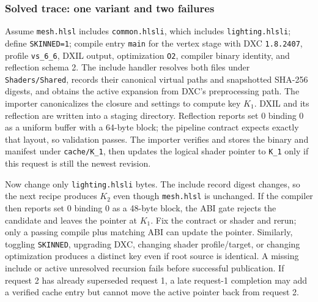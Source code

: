 \subsubsection{Solved trace: one variant and two failures}\label{05-engine-i-ch010-solved-trace-one-variant-and-two-failures}

Assume \texttt{mesh.hlsl} includes \texttt{common.hlsli}, which includes \texttt{lighting.hlsli}; define \texttt{SKINNED=1}; compile entry \texttt{main} for the vertex stage with DXC \texttt{1.8.2407}, profile \texttt{vs\_6\_6}, DXIL output, optimization \texttt{O2}, compiler binary identity, and reflection schema 2. The include handler resolves both files under \texttt{Shaders/Shared}, records their canonical virtual paths and snapshotted SHA-256 digests, and obtains the active expansion from DXC's preprocessing path. The importer canonicalizes the closure and settings to compute key \(K_1\). DXIL and its reflection are written into a staging directory. Reflection reports set 0 binding 0 as a uniform buffer with a 64-byte block; the pipeline contract expects exactly that layout, so validation passes. The importer verifies and stores the binary and manifest under \texttt{cache/K\_1}, then updates the logical shader pointer to \texttt{K\_1} only if this request is still the newest revision.

Now change only \texttt{lighting.hlsli} bytes. The include record digest changes, so the next recipe produces \(K_2\) even though \texttt{mesh.hlsl} is unchanged. If the compiler then reports set 0 binding 0 as a 48-byte block, the ABI gate rejects the candidate and leaves the pointer at \(K_1\). Fix the contract or shader and rerun; only a passing compile plus matching ABI can update the pointer. Similarly, toggling \texttt{SKINNED}, upgrading DXC, changing shader profile/target, or changing optimization produces a distinct key even if root source is identical. A missing include or active unresolved recursion fails before successful publication. If request 2 has already superseded request 1, a late request-1 completion may add a verified cache entry but cannot move the active pointer back from request 2.

